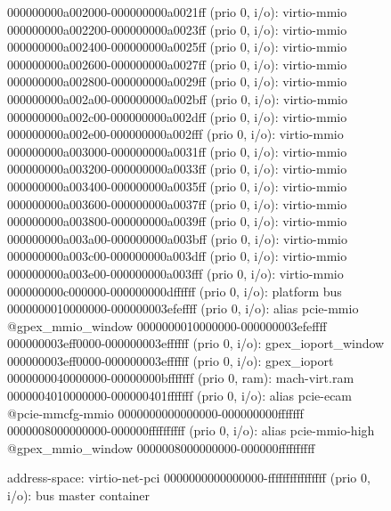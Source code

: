\begin{figure}[ht]
\begin{minipage}{0.48\linewidth}
\begin{ffcode}
        000000000a002000-000000000a0021ff (prio 0, i/o): virtio-mmio
        000000000a002200-000000000a0023ff (prio 0, i/o): virtio-mmio
        000000000a002400-000000000a0025ff (prio 0, i/o): virtio-mmio
        000000000a002600-000000000a0027ff (prio 0, i/o): virtio-mmio
        000000000a002800-000000000a0029ff (prio 0, i/o): virtio-mmio
        000000000a002a00-000000000a002bff (prio 0, i/o): virtio-mmio
        000000000a002c00-000000000a002dff (prio 0, i/o): virtio-mmio
        000000000a002e00-000000000a002fff (prio 0, i/o): virtio-mmio
        000000000a003000-000000000a0031ff (prio 0, i/o): virtio-mmio
        000000000a003200-000000000a0033ff (prio 0, i/o): virtio-mmio
        000000000a003400-000000000a0035ff (prio 0, i/o): virtio-mmio
        000000000a003600-000000000a0037ff (prio 0, i/o): virtio-mmio
        000000000a003800-000000000a0039ff (prio 0, i/o): virtio-mmio
        000000000a003a00-000000000a003bff (prio 0, i/o): virtio-mmio
        000000000a003c00-000000000a003dff (prio 0, i/o): virtio-mmio
        000000000a003e00-000000000a003fff (prio 0, i/o): virtio-mmio
        000000000c000000-000000000dffffff (prio 0, i/o): platform bus
        0000000010000000-000000003efeffff (prio 0, i/o): alias pcie-mmio @gpex_mmio_window 0000000010000000-000000003efeffff
        000000003eff0000-000000003effffff (prio 0, i/o): gpex_ioport_window
          000000003eff0000-000000003effffff (prio 0, i/o): gpex_ioport
        0000000040000000-00000000bfffffff (prio 0, ram): mach-virt.ram
        0000004010000000-000000401fffffff (prio 0, i/o): alias pcie-ecam @pcie-mmcfg-mmio 0000000000000000-000000000fffffff
        0000008000000000-000000ffffffffff (prio 0, i/o): alias pcie-mmio-high @gpex_mmio_window 0000008000000000-000000ffffffffff
    \end{ffcode}
    \end{minipage}
    \begin{minipage}{0.48\linewidth}
    \begin{ffcode}
    address-space: virtio-net-pci
      0000000000000000-ffffffffffffffff (prio 0, i/o): bus master container


\end{ffcode}
\end{minipage}
\end{figure}
